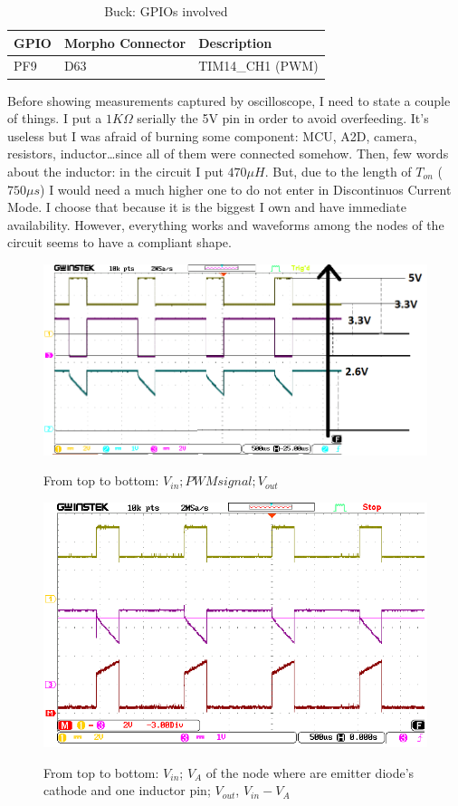\begin{table}[H]
\centering
\begin{tabular}{p{}p{}p{}}

\textbf{GPIO}&\textbf{Morpho Connector}&\textbf{Description}\\ \hline
PF9 & D63 & TIM14\_CH1 (PWM)\\ 

\hline
\end{tabular}
\caption{Buck: GPIOs involved}
\end{table}

Before showing measurements captured by oscilloscope, I need to state a couple of things. I put a $1K\Omega$ serially the 5V pin in order to avoid overfeeding. It's useless but I was afraid of burning some component: MCU, A2D, camera, resistors, inductor\dots since all of them were connected somehow. Then, few words about the inductor: in the circuit I put $470\mu H$. But, due to the length of $T_{on}$ ($750\mu s$) I would need a much higher one to do not enter in Discontinuos Current Mode. I choose that because it is the biggest I own and have immediate availability. However, everything works and waveforms among the nodes of the circuit seems  to have a compliant shape.

\begin{figure}[H]
\centering
\includegraphics[scale=.7]{Immagini/12}
\label{12}
\caption{From top to bottom: $V_{in}; PWM signal; V_{out}$}
\end{figure}

\begin{figure}[H]
\centering
\includegraphics[scale=.8]{Immagini/14}
\label{12}
\caption{From top to bottom: $V_{in}$; $V_A$ of the node where are emitter  diode's cathode and one inductor pin; $V_{out}$, $V_{in}-V_{A}$}
\end{figure}
